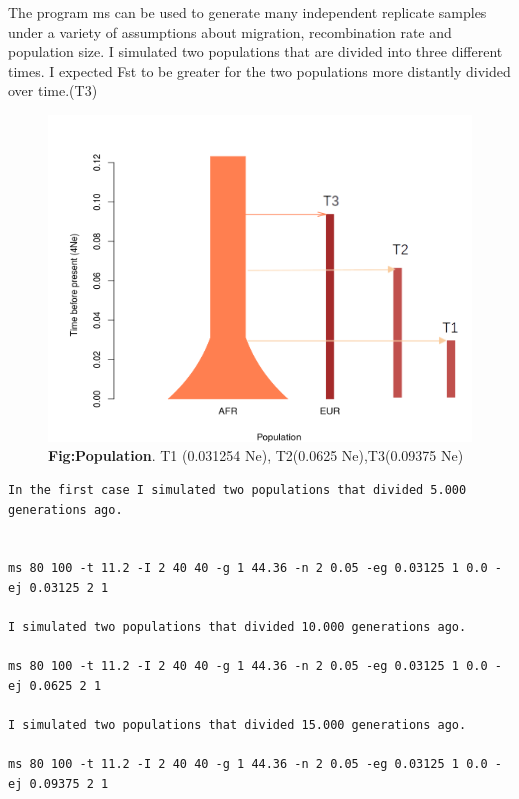 The program ms can be used to generate many independent replicate samples under a variety of assumptions about migration, recombination rate and population size. I simulated two populations that are divided into three different times. I expected Fst to be greater for the two populations more distantly divided over time.(T3)





\begin{figure}[H]
\centering
\includegraphics[width=1.10\textwidth]{fig/populationthreetime.png}
\decoRule
\caption{\textbf{Fig:Population}. 
T1 (0.031254 Ne), T2(0.0625 Ne),T3(0.09375 Ne)}
\label{fig:population.pdf}
\end{figure}

\begin{verbatim}
In the first case I simulated two populations that divided 5.000 generations ago.


ms 80 100 -t 11.2 -I 2 40 40 -g 1 44.36 -n 2 0.05 -eg 0.03125 1 0.0 -ej 0.03125 2 1   

I simulated two populations that divided 10.000 generations ago.

ms 80 100 -t 11.2 -I 2 40 40 -g 1 44.36 -n 2 0.05 -eg 0.03125 1 0.0 -ej 0.0625 2 1   

I simulated two populations that divided 15.000 generations ago.

ms 80 100 -t 11.2 -I 2 40 40 -g 1 44.36 -n 2 0.05 -eg 0.03125 1 0.0 -ej 0.09375 2 1   
\end{verbatim}

